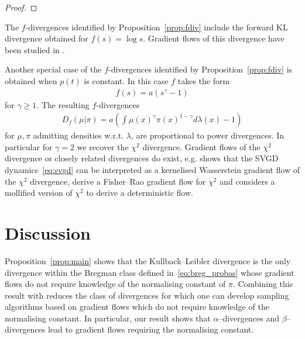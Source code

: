 \documentclass{article}
\begin{document}
\begin{proof}
\end{proof}

The $f$-divergences identified by Proposition~\ref{prop:fdiv} include the forward KL divergence obtained for $f(s) = \log s$. Gradient flows of this divergence have been studied in \cite{zhu2025inclusive}.

Another special case of the $f$-divergences identified by Proposition~\ref{prop:fdiv} is obtained when $p(t)$ is constant. In this case $f$ takes the form
\begin{align*}
    f(s) =  a(s^{\gamma}-1)
\end{align*}
for $\gamma\geq 1$. The resulting $f$-divergences
\begin{align*}
    D_f(\mu|\pi) = a\left(\int \mu(x)^\gamma \pi(x)^{1-\gamma}d\lambda(x) -1\right)
\end{align*}
for $\mu, \pi$ admitting densities w.r.t. $\lambda$, are proportional to power divergences.
In particular for $\gamma=2$ we recover the $\chi^2$ divergence.
Gradient flows of the $\chi^2$ divergence or closely related divergences do exist, e.g. \cite{chewi2020svgd} shows that the SVGD dynamics~\eqref{eq:svgd} can be interpreted as a kernelised Wasserstein gradient flow of the $\chi^2$ divergence, \cite[Section 3]{lu2023birth} derive a Fisher--Rao gradient flow for $\chi^2$ and \cite{li2023sampling} considers a mollified version of $\chi^2$ to derive a deterministic flow.



\section{Discussion}

Proposition~\ref{prop:main} shows that the Kullback--Leibler divergence is the only divergence within the Bregman class defined in~\eqref{eq:breg_probas} whose gradient flows do not require knowledge of the normalising constant of $\pi$. Combining this result with \citet[Theorem 4.1]{chen2023sampling} reduces the class of divergences for which one can develop sampling algorithms based on gradient flows which do not require knowledge of the normalising constant. In particular, our result shows that $\alpha$--divergences and $\beta$--divergences lead to gradient flows requiring the normalising constant.
\end{document}
